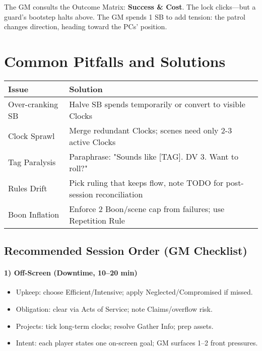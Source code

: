 The GM consults the Outcome Matrix: \textbf{Success \& Cost}. The lock clicks---but a guard's bootstep halts above. The GM spends 1 SB to add tension: the patrol changes direction, heading toward the PCs' position.

\section{Common Pitfalls and Solutions}

\begin{fatebox}
\begin{tabularx}{\textwidth}{lX}
\toprule
\textbf{Issue} & \textbf{Solution} \\
\midrule
Over-cranking SB & Halve SB spends temporarily or convert to visible Clocks \\
Clock Sprawl & Merge redundant Clocks; scenes need only 2-3 active Clocks \\
Tag Paralysis & Paraphrase: "Sounds like [TAG]. DV 3. Want to roll?" \\
Rules Drift & Pick ruling that keeps flow, note TODO for post-session reconciliation \\
Boon Inflation & Enforce 2 Boon/scene cap from failures; use Repetition Rule \\
\bottomrule
\end{tabularx}
\end{fatebox}

\subsection{Recommended Session Order (GM Checklist)}

\paragraph{1) Off-Screen (Downtime, 10–20 min)}
\begin{itemize}
  \item Upkeep: choose Efficient/Intensive; apply Neglected/Compromised if missed.
  \item Obligation: clear via Acts of Service; note Claims/overflow risk.
  \item Projects: tick long-term clocks; resolve Gather Info; prep assets.
  \item Intent: each player states one on-screen goal; GM surfaces 1–2 front pressures.
\end{itemize}

